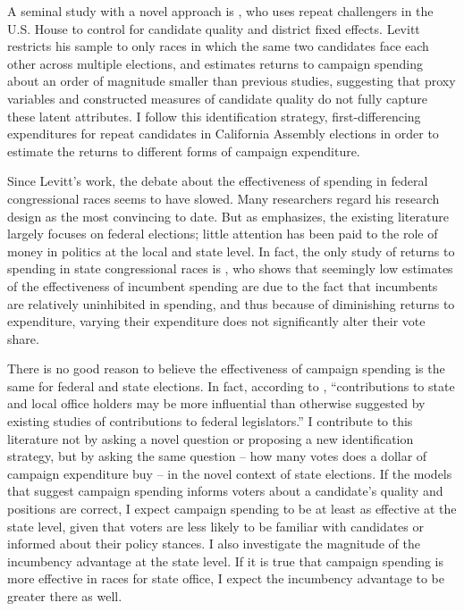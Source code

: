 \documentclass{article}
\begin{document}
A seminal study with a novel approach is \cite{levitt-1994}, who uses repeat challengers in the U.S. House to control for candidate quality and district fixed effects. Levitt restricts his sample to only races in which the same two candidates face each other across multiple elections, and estimates returns to campaign spending about an order of magnitude smaller than previous studies, suggesting that proxy variables and constructed measures of candidate quality do not fully capture these latent attributes. I follow this identification strategy, first-differencing expenditures for repeat candidates in California Assembly elections in order to estimate the returns to different forms of campaign expenditure.

Since Levitt's work, the debate about the effectiveness of spending in federal congressional races seems to have slowed. Many researchers regard his research design as the most convincing to date. But as \cite{milyo2015money} emphasizes, the existing literature largely focuses on federal elections; little attention has been paid to the role of money in politics at the local and state level. In fact, the only study of returns to spending in state congressional races is \cite{stratmann2006contribution}, who shows that seemingly low estimates of the effectiveness of incumbent spending are due to the fact that incumbents are relatively uninhibited in spending, and thus because of diminishing returns to expenditure, varying their expenditure does not significantly alter their vote share. 

There is no good reason to believe the effectiveness of campaign spending is the same for federal and state elections. In fact, according to \cite{milyo2015money}, ``contributions to state and local office holders may be more influential than otherwise suggested by existing studies of contributions to federal legislators.'' I contribute to this literature not by asking a novel question or proposing a new identification strategy, but by asking the same question -- how many votes does a dollar of campaign expenditure buy -- in the novel context of state elections. If the models that suggest campaign spending informs voters about a candidate's quality and positions are correct, I expect campaign spending to be at least as effective at the state level, given that voters are less likely to be familiar with candidates or informed about their policy stances. I also investigate the magnitude of the incumbency advantage at the state level. If it is true that campaign spending is more effective in races for state office, I expect the incumbency advantage to be greater there as well.
\end{document}
